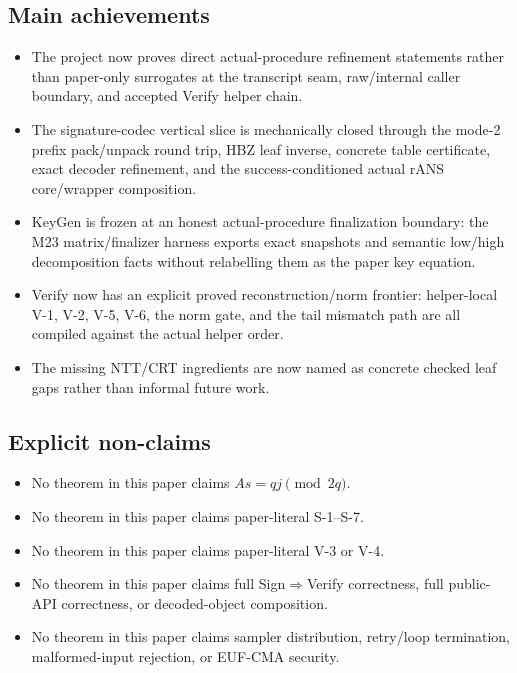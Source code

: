 \subsection*{Main achievements}

\begin{itemize}
\item The project now proves direct actual-procedure refinement statements
  rather than paper-only surrogates at the transcript seam, raw/internal
  caller boundary, and accepted Verify helper chain.
\item The signature-codec vertical slice is mechanically closed through the
  mode-2 prefix pack/unpack round trip, HBZ leaf inverse, concrete table
  certificate, exact decoder refinement, and the success-conditioned actual
  rANS core/wrapper composition.
\item KeyGen is frozen at an honest actual-procedure finalization boundary:
  the M23 matrix/finalizer harness exports exact snapshots and semantic
  low/high decomposition facts without relabelling them as the paper key
  equation.
\item Verify now has an explicit proved reconstruction/norm frontier:
  helper-local V-1, V-2, V-5, V-6, the norm gate, and the tail mismatch path
  are all compiled against the actual helper order.
\item The missing NTT/CRT ingredients are now named as concrete checked leaf
  gaps rather than informal future work.
\end{itemize}

\subsection*{Explicit non-claims}

\begin{itemize}
\item No theorem in this paper claims \(A s = q j \pmod{2q}\).
\item No theorem in this paper claims paper-literal S-1--S-7.
\item No theorem in this paper claims paper-literal V-3 or V-4.
\item No theorem in this paper claims full Sign\(\Rightarrow\)Verify
  correctness, full public-API correctness, or decoded-object composition.
\item No theorem in this paper claims sampler distribution, retry/loop
  termination, malformed-input rejection, or EUF-CMA security.
\end{itemize}


